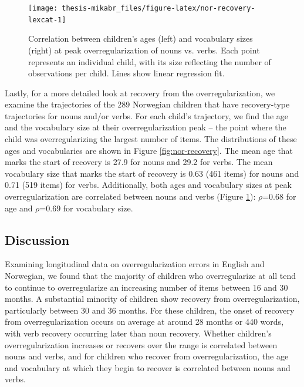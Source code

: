 \documentclass[
   11pt,
       ]{book}
\begin{document}
\begin{figure}

{\centering \texttt{[image: thesis-mikabr\_files/figure-latex/nor-recovery-lexcat-1]} 

}

\caption{Correlation between children's ages (left) and vocabulary sizes (right) at peak overregularization of nouns vs. verbs. Each point represents an individual child, with its size reflecting the number of observations per child. Lines show linear regression fit.}\label{fig:nor-recovery-lexcat}
\end{figure}

Lastly, for a more detailed look at recovery from the overregularization, we examine the trajectories of the 289 Norwegian children that have recovery-type trajectories for nouns and/or verbs. For each child's trajectory, we find the age and the vocabulary size at their overregularization peak -- the point where the child was overregularizing the largest number of items. The distributions of these ages and vocabularies are shown in Figure \ref{fig:nor-recovery}. The mean age that marks the start of recovery is 27.9 for nouns and 29.2 for verbs. The mean vocabulary size that marks the start of recovery is 0.63 (461 items) for nouns and 0.71 (519 items) for verbs. Additionally, both ages and vocabulary sizes at peak overregularization are correlated between nouns and verbs (Figure \ref{fig:nor-recovery-lexcat}): \(\rho\)=0.68 for age and \(\rho\)=0.69 for vocabulary size.

\hypertarget{discussion-2}{%
\subsection{Discussion}\label{discussion-2}}

Examining longitudinal data on overregularization errors in English and Norwegian, we found that the majority of children who overregularize at all tend to continue to overregularize an increasing number of items between 16 and 30 months. A substantial minority of children show recovery from overregularization, particularly between 30 and 36 months. For these children, the onset of recovery from overregularization occurs on average at around 28 months or 440 words, with verb recovery occurring later than noun recovery. Whether children's overregularization increases or recovers over the range is correlated between nouns and verbs, and for children who recover from overregularization, the age and vocabulary at which they begin to recover is correlated between nouns and verbs.
\end{document}
